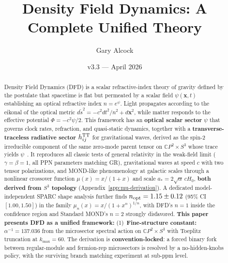 \documentclass[aps,prd,twocolumn,superscriptaddress,showpacs,floatfix,nofootinbib]{revtex4-2}
\newcommand{\DFD}{DFD\xspace}
\newcommand{\GR}{GR\xspace}
\theoremstyle{plain}
\theoremstyle{definition}
\theoremstyle{remark}
\begin{document}
\title{Density Field Dynamics: A Complete Unified Theory}

\author{Gary Alcock}

\date{v3.3 --- April 2026\\[2pt]
}

\begin{abstract}
Density Field Dynamics (\DFD) is a scalar refractive-index theory of gravity 
defined by the postulate that spacetime is flat but permeated by a scalar field 
$\psi(\mathbf{x},t)$ establishing an optical refractive index $n = e^\psi$. 
Light propagates according to the eikonal of the optical metric 
$d\tilde{s}^2 = -c^2 dt^2/n^2 + d\mathbf{x}^2$, while matter responds to the 
effective potential $\Phi = -c^2\psi/2$. This framework has an \textbf{optical scalar sector} 
$\psi$ that governs clock rates, refraction, and quasi-static dynamics, together with a 
\textbf{transverse-traceless radiative sector} $h^{\rm TT}_{ij}$ for gravitational waves,
derived as the spin-2 irreducible component of the same zero-mode parent tensor on
$\mathbb{C}P^2 \times S^3$ whose trace yields $\psi$~\cite{AlcockConstitutive2026}. 
It reproduces all classic tests of general relativity in the weak-field limit 
($\gamma = \beta = 1$, all PPN parameters matching \GR), gravitational waves 
at speed $c$ with two tensor polarizations, and MOND-like phenomenology at 
galactic scales through a nonlinear crossover function $\mu(x) = x/(1+x)$ 
and scale $a_* = 2\sqrt{\alpha}\,cH_0$, \textbf{both derived from $S^3$ topology} (Appendix~\ref{app:mu-derivation}). A dedicated model-independent SPARC shape analysis further finds $n_{\rm opt}=1.15\pm0.12$ (95\% CI $[1.00,1.50]$) in the family $\mu_n(x)=x/(1+x^n)^{1/n}$, with DFD's $n=1$ inside the confidence region and Standard MOND's $n=2$ strongly disfavored.
%
\textbf{This paper presents DFD as a unified framework:}
%
(1)~\textbf{Fine-structure constant:} $\alpha^{-1} = 137.036$ from the microsector spectral action on $\mathbb{C}P^2 \times S^3$ 
with Toeplitz truncation at $k_{\max} = 60$. The derivation is \textbf{convention-locked}: a forced binary fork between regular-module 
and fermion-rep microsectors is resolved by a no-hidden-knobs policy, with the surviving branch matching experiment at sub-ppm level. 

\end{abstract}
\end{document}
